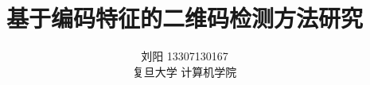 \documentclass[a4paper, twocolumn]{article}
\title{基于编码特征的二维码检测方法研究} %
\author{%
	\textsc{刘阳 13307130167} \\[1ex] %
	\normalsize 复旦大学 计算机学院 \\ %
}
\date{} %
\begin{document}
\begin{CJK}{UTF8}{gbsn}
	\maketitle
	
	
	
	
	
	
	
	
	
	\renewcommand{\refname}{参考文献}
	
	
\end{CJK}	
\end{document}
